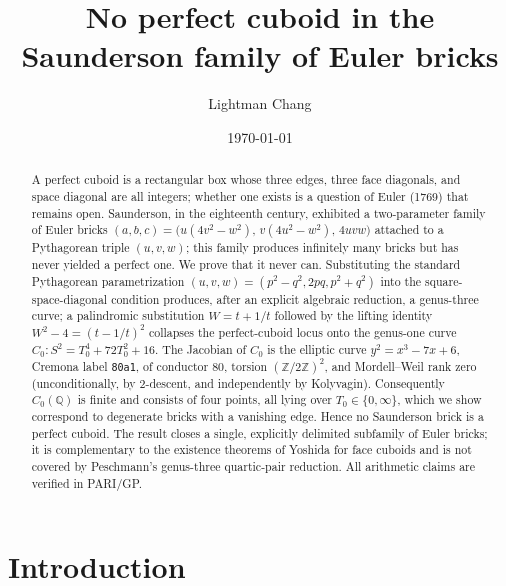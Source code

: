 \documentclass[11pt,reqno]{amsart}
\theoremstyle{plain}
\theoremstyle{definition}
\newcommand{\Q}{\mathbb{Q}}
\newcommand{\Z}{\mathbb{Z}}
\begin{document}
\title[No perfect cuboid in the Saunderson family]{No perfect cuboid in the Saunderson family of Euler bricks}

\author{Lightman Chang}
\address{Independent Researcher}


\date{\today}

\begin{abstract}
A perfect cuboid is a rectangular box whose three edges, three face diagonals,
and space diagonal are all integers; whether one exists is a question of Euler
(1769) that remains open. Saunderson, in the eighteenth century, exhibited a
two-parameter family of Euler bricks
$(a,b,c)=\bigl(u(4v^2-w^2),\,v(4u^2-w^2),\,4uvw\bigr)$ attached to a Pythagorean
triple $(u,v,w)$; this family produces infinitely many bricks but has never
yielded a perfect one. We prove that it never can. Substituting the standard
Pythagorean parametrization $(u,v,w)=(p^2-q^2,2pq,p^2+q^2)$ into the
square-space-diagonal condition produces, after an explicit algebraic
reduction, a genus-three curve; a palindromic substitution $W=t+1/t$ followed
by the lifting identity $W^2-4=(t-1/t)^2$ collapses the perfect-cuboid locus
onto the genus-one curve $C_0:S^2=T_0^4+72T_0^2+16$. The Jacobian of $C_0$ is the
elliptic curve $y^2=x^3-7x+6$, Cremona label \texttt{80a1}, of conductor $80$,
torsion $(\Z/2\Z)^2$, and Mordell--Weil rank zero (unconditionally, by
$2$-descent, and independently by Kolyvagin). Consequently $C_0(\Q)$ is finite
and consists of four points, all lying over $T_0\in\{0,\infty\}$, which we show
correspond to degenerate bricks with a vanishing edge. Hence no Saunderson
brick is a perfect cuboid. The result closes a single, explicitly delimited
subfamily of Euler bricks; it is complementary to the existence theorems of
Yoshida for face cuboids and is not covered by Peschmann's genus-three
quartic-pair reduction. All arithmetic claims are verified in PARI/GP.
\end{abstract}

\maketitle

\section{Introduction}\label{sec:intro}
\end{document}
